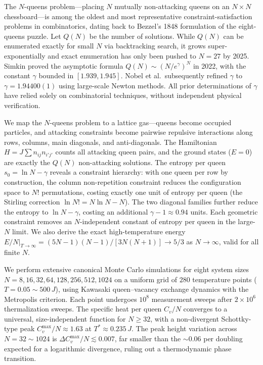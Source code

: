 \begin{abstract*}
The $N$-queens problem---placing $N$ mutually non-attacking queens on an
$N\times N$ chessboard---is among the oldest and most representative
constraint-satisfaction problems in combinatorics, dating back to Bezzel's
1848 formulation of the eight-queens puzzle. Let $Q(N)$ be the number of
solutions. While $Q(N)$ can be enumerated exactly for small $N$ via backtracking
search, it grows super-exponentially and exact enumeration has only been pushed
to $N=27$ by 2025. Simkin proved the asymptotic formula
$Q(N)\sim(N/e^\gamma)^N$ in 2022, with the constant $\gamma$ bounded in
$[1.939,1.945]$. Nobel et al.\ subsequently refined $\gamma$ to
$\gamma=1.94400(1)$ using large-scale Newton methods. All prior determinations
of $\gamma$ have relied solely on combinatorial techniques, without independent
physical verification.

We map the $N$-queens problem to a lattice gas---queens become occupied particles,
and attacking constraints become pairwise repulsive interactions along rows,
columns, main diagonals, and anti-diagonals. The Hamiltonian
$H=J\sum n_{ij}n_{i'j'}$ counts all attacking queen pairs, and the ground states
($E=0$) are exactly the $Q(N)$ non-attacking solutions. The entropy per queen
$s_0=\ln N-\gamma$ reveals a constraint hierarchy: with one queen per row by
construction, the column non-repetition constraint reduces the configuration
space to $N!$ permutations, costing exactly one unit of entropy per queen
(the Stirling correction $\ln N!=N\ln N-N$). The two diagonal families further
reduce the entropy to $\ln N-\gamma$, costing an additional
$\gamma-1\approx0.94$ units. Each geometric constraint removes an $N$-independent
constant of entropy per queen in the large-$N$ limit. We also derive the exact
high-temperature energy
$E/N|_{T\to\infty}=(5N-1)(N-1)/[3N(N+1)]\to5/3$ as $N\to\infty$, valid for
all finite $N$.

We perform extensive canonical Monte Carlo simulations for eight system sizes
$N=8,16,32,64,128,256,512,1024$ on a uniform grid of $280$ temperature points
($T=0.05\sim500\,J$), using Kawasaki queen--vacancy exchange dynamics with the
Metropolis criterion. Each point undergoes $10^8$ measurement sweeps after
$2\times10^6$ thermalization sweeps. The specific heat per queen $C_v/N$
converges to a universal, size-independent function for $N\ge32$, with a
non-divergent Schottky-type peak $C_v^{\max}/N\approx1.63$ at
$T^*\approx0.235\,J$. The peak height variation across $N=32\sim1024$ is
$\Delta C_v^{\max}/N\lesssim0.007$, far smaller than the $\sim0.06$ per
doubling expected for a logarithmic divergence, ruling out a thermodynamic
phase transition.


\end{abstract*}
